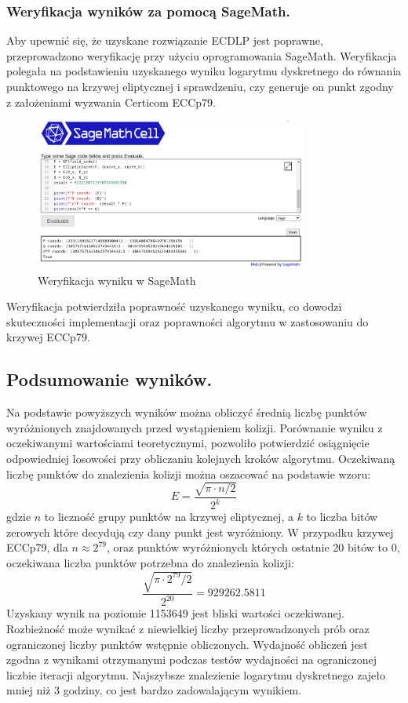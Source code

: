 \subsubsection{Weryfikacja wyników za pomocą SageMath.}
Aby upewnić się, że uzyskane rozwiązanie ECDLP jest poprawne, przeprowadzono
weryfikację przy użyciu oprogramowania SageMath. Weryfikacja polegała na
podstawieniu uzyskanego wyniku logarytmu dyskretnego do równania punktowego
na krzywej eliptycznej i sprawdzeniu, czy generuje on punkt
zgodny z założeniami wyzwania Certicom ECCp79.
\begin{figure}[H]
    \centering
    \includegraphics[width=0.8\textwidth]{img/sage_check_full.png}
    \caption{Weryfikacja wyniku w SageMath}
    \label{fig:sage_verification}
\end{figure}

Weryfikacja potwierdziła poprawność uzyskanego wyniku, co dowodzi skuteczności
implementacji oraz poprawności algorytmu w zastosowaniu do krzywej ECCp79.

\subsection{Podsumowanie wyników.}
Na podstawie powyższych wyników można obliczyć średnią liczbę punktów wyróżnionych
znajdowanych przed wystąpieniem kolizji.
Porównanie wyniku z oczekiwanymi wartościami teoretycznymi, pozwoliło potwierdzić
osiągnięcie odpowiedniej losowości przy obliczaniu kolejnych kroków algorytmu.
Oczekiwaną liczbę punktów do znalezienia kolizji można oszacować na podstawie wzoru:
$$
    E = \frac{\sqrt{\pi \cdot n / 2}}{2^k}
$$
gdzie $n$ to liczność grupy punktów na krzywej eliptycznej, a $k$ to liczba bitów zerowych które decydują
czy dany punkt jest wyróżniony. W przypadku krzywej ECCp79,
dla $n \approx 2^{79}$, oraz punktów wyróżnionych których ostatnie 20 bitów to $0$, oczekiwana liczba
punktów potrzebna do znalezienia kolizji:
$$
    \frac{\sqrt{\pi \cdot 2^{79} / 2}}{2^{20}} = 929262.5811
$$
Uzyskany wynik na poziomie 1153649 jest bliski wartości oczekiwanej. Rozbieżność może wynikać z niewielkiej
liczby przeprowadzonych prób oraz ograniczonej liczby punktów wstępnie obliczonych.
Wydajność obliczeń jest zgodna z wynikami otrzymanymi podczas testów wydajności na ograniczonej liczbie iteracji algorytmu.
Najszybsze znalezienie logarytmu dyskretnego zajeło mniej niż 3 godziny, co jest bardzo zadowalającym wynikiem.

